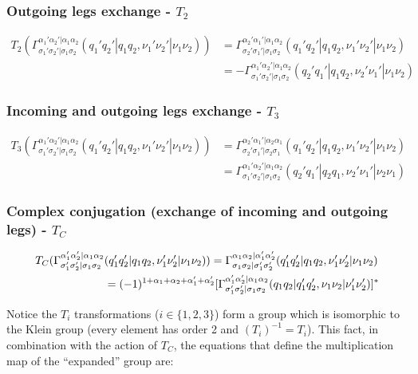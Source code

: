 \documentclass[12pt,a4paper,roman]{article}
\begin{document}
\subsubsection*{Outgoing legs exchange - $T_2$}
\begin{align}
    T_2 \left( \Gamma_{\sigma_1'\sigma_2'|\sigma_1\sigma_2}^{\alpha_1'\alpha_2'|\alpha_1\alpha_2}(q_1'q_2'|q_1q_2, \nu_1'\nu_2'|\nu_1\nu_2) \right) &= \Gamma_{\sigma_2'\sigma_1'|\sigma_1\sigma_2}^{\alpha_2'\alpha_1'|\alpha_1\alpha_2}(q_1'q_2'|q_1q_2, \nu_1'\nu_2'|\nu_1\nu_2)\\
    &= -\Gamma_{\sigma_1'\sigma_2'|\sigma_1\sigma_2}^{\alpha_1'\alpha_2'|\alpha_1\alpha_2}(q_2'q_1'|q_1q_2, \nu_2'\nu_1'|\nu_1\nu_2)
    \label{eq:t2}
\end{align}

\subsubsection*{Incoming and outgoing legs exchange - $T_3$}
\begin{align}
    T_3 \left( \Gamma_{\sigma_1'\sigma_2'|\sigma_1\sigma_2}^{\alpha_1'\alpha_2'|\alpha_1\alpha_2}(q_1'q_2'|q_1q_2, \nu_1'\nu_2'|\nu_1\nu_2) \right) &= \Gamma_{\sigma_2'\sigma_1'|\sigma_2\sigma_1}^{\alpha_2'\alpha_1'|\alpha_2\alpha_1}(q_1'q_2'|q_1q_2, \nu_1'\nu_2'|\nu_1\nu_2)\\
    &= \Gamma_{\sigma_1'\sigma_2'|\sigma_1\sigma_2}^{\alpha_1'\alpha_2'|\alpha_1\alpha_2}(q_2'q_1'|q_2q_1, \nu_2'\nu_1'|\nu_2\nu_1)
    \label{eq:t3}
\end{align}

\subsubsection*{Complex conjugation (exchange of incoming and outgoing legs) - $T_C$}
\begin{align}
    T_C \large( \Gamma_{\sigma_1'\sigma_2'|\sigma_1\sigma_2}^{\alpha_1'\alpha_2'|\alpha_1\alpha_2}&(q_1'q_2'|q_1q_2, \nu_1'\nu_2'|\nu_1\nu_2) \large) = \Gamma_{\sigma_1\sigma_2|\sigma_1'\sigma_2'}^{\alpha_1\alpha_2|\alpha_1'\alpha_2'}(q_1'q_2'|q_1q_2, \nu_1'\nu_2'|\nu_1\nu_2)\\
    &=(-1)^{1+\alpha_1+\alpha_2+\alpha_1'+\alpha_2'}[ \Gamma_{\sigma_1'\sigma_2'|\sigma_1\sigma_2}^{\alpha_1'\alpha_2'|\alpha_1\alpha_2}(q_1q_2|q_1'q_2', \nu_1\nu_2|\nu_1'\nu_2')]^*
    \label{eq:tc}
\end{align}

Notice the $T_i$ transformations ($i\in \{1,2,3\}$) form a group which is isomorphic to the Klein group (every element has order 2 and $(T_i)^{-1} = T_i$). This fact, in combination with the action of $T_C$, the equations that define the multiplication map of the ``expanded'' group are:
\end{document}
